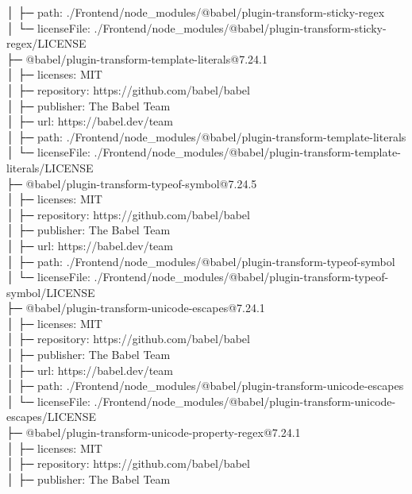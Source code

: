 \documentclass[
    paper=a4,
    twoside=false,
    parskip=half,
    listof=entryprefix,
    listof=totoc,
    index=totoc,
    bibliography=totoc,
    headsepline,
]{scrbook}
\begin{document}
    │  ├─ path: ./Frontend/node\_modules/@babel/plugin-transform-sticky-regex\\
    │  └─ licenseFile: ./Frontend/node\_modules/@babel/plugin-transform-sticky-regex/LICENSE\\
    ├─ @babel/plugin-transform-template-literals@7.24.1\\
    │  ├─ licenses: MIT\\
    │  ├─ repository: https://github.com/babel/babel\\
    │  ├─ publisher: The Babel Team\\
    │  ├─ url: https://babel.dev/team\\
    │  ├─ path: ./Frontend/node\_modules/@babel/plugin-transform-template-literals\\
    │  └─ licenseFile: ./Frontend/node\_modules/@babel/plugin-transform-template-literals/LICENSE\\
    ├─ @babel/plugin-transform-typeof-symbol@7.24.5\\
    │  ├─ licenses: MIT\\
    │  ├─ repository: https://github.com/babel/babel\\
    │  ├─ publisher: The Babel Team\\
    │  ├─ url: https://babel.dev/team\\
    │  ├─ path: ./Frontend/node\_modules/@babel/plugin-transform-typeof-symbol\\
    │  └─ licenseFile: ./Frontend/node\_modules/@babel/plugin-transform-typeof-symbol/LICENSE\\
    ├─ @babel/plugin-transform-unicode-escapes@7.24.1\\
    │  ├─ licenses: MIT\\
    │  ├─ repository: https://github.com/babel/babel\\
    │  ├─ publisher: The Babel Team\\
    │  ├─ url: https://babel.dev/team\\
    │  ├─ path: ./Frontend/node\_modules/@babel/plugin-transform-unicode-escapes\\
    │  └─ licenseFile: ./Frontend/node\_modules/@babel/plugin-transform-unicode-escapes/LICENSE\\
    ├─ @babel/plugin-transform-unicode-property-regex@7.24.1\\
    │  ├─ licenses: MIT\\
    │  ├─ repository: https://github.com/babel/babel\\
    │  ├─ publisher: The Babel Team\\
\end{document}
